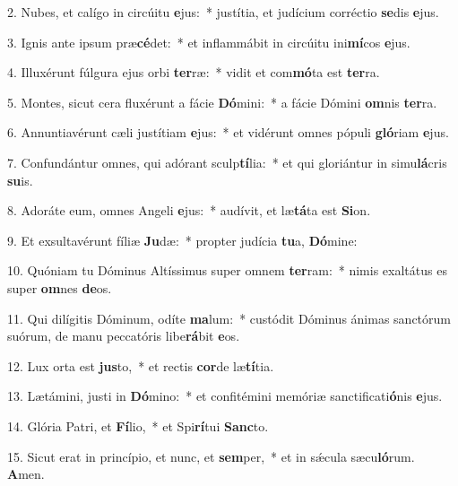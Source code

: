2. Nubes, et calígo in circúitu \textbf{e}jus:~*  justítia, et judícium corréctio \textbf{se}dis \textbf{e}jus.\

3. Ignis ante ipsum præ\textbf{cé}det:~*  et inflammábit in circúitu ini\textbf{mí}cos \textbf{e}jus.\

4. Illuxérunt fúlgura ejus orbi \textbf{ter}ræ:~*  vidit et com\textbf{mó}ta est \textbf{ter}ra.\

5. Montes, sicut cera fluxérunt a fácie \textbf{Dó}mini:~*  a fácie Dómini \textbf{om}nis \textbf{ter}ra.\

6. Annuntiavérunt cæli justítiam \textbf{e}jus:~*  et vidérunt omnes pópuli \textbf{gló}riam \textbf{e}jus.\

7. Confundántur omnes, qui adórant sculp\textbf{tí}lia:~*  et qui gloriántur in simu\textbf{lá}cris \textbf{su}is.\

8. Adoráte eum, omnes Angeli \textbf{e}jus:~*  audívit, et læ\textbf{tá}ta est \textbf{Si}on.\

9. Et exsultavérunt fíliæ \textbf{Ju}dæ:~*  propter judícia \textbf{tu}a, \textbf{Dó}mine:\

10. Quóniam tu Dóminus Altíssimus super omnem \textbf{ter}ram:~*  nimis exaltátus es super \textbf{om}nes \textbf{de}os.\

11. Qui dilígitis Dóminum, odíte \textbf{ma}lum:~*  custódit Dóminus ánimas sanctórum suórum, de manu peccatóris libe\textbf{rá}bit \textbf{e}os.\

12. Lux orta est \textbf{jus}to,~*  et rectis \textbf{cor}de læ\textbf{tí}tia.\

13. Lætámini, justi in \textbf{Dó}mino:~*  et confitémini memóriæ sanctificati\textbf{ó}nis \textbf{e}jus.\

14. Glória Patri, et \textbf{Fí}lio,~*  et Spi\textbf{rí}tui \textbf{Sanc}to.\

15. Sicut erat in princípio, et nunc, et \textbf{sem}per,~*  et in sǽcula sæcu\textbf{ló}rum. \textbf{A}men.\

